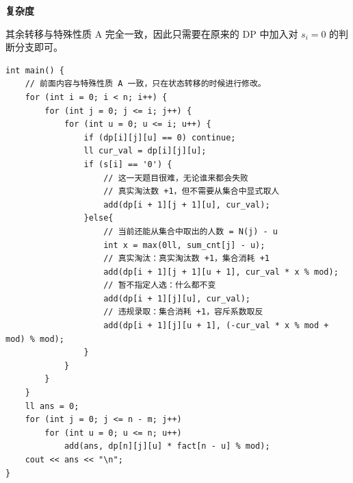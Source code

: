 \documentclass{book}
\begin{document}
\par\medskip
\noindent\textbf{复杂度}
\par\medskip
其余转移与特殊性质 A 完全一致，因此只需要在原来的 DP 中加入对 $s_i = 0$ 的判断分支即可。

\begin{lstlisting}[style = code]
int main() {
    // 前面内容与特殊性质 A 一致，只在状态转移的时候进行修改。
    for (int i = 0; i < n; i++) {
        for (int j = 0; j <= i; j++) {
            for (int u = 0; u <= i; u++) {
                if (dp[i][j][u] == 0) continue;
                ll cur_val = dp[i][j][u];
                if (s[i] == '0') {
                    // 这一天题目很难，无论谁来都会失败
                    // 真实淘汰数 +1，但不需要从集合中显式取人
                    add(dp[i + 1][j + 1][u], cur_val);
                }else{
                    // 当前还能从集合中取出的人数 = N(j) - u
                    int x = max(0ll, sum_cnt[j] - u);
                    // 真实淘汰：真实淘汰数 +1，集合消耗 +1
                    add(dp[i + 1][j + 1][u + 1], cur_val * x % mod);
                    // 暂不指定人选：什么都不变
                    add(dp[i + 1][j][u], cur_val);
                    // 违规录取：集合消耗 +1，容斥系数取反
                    add(dp[i + 1][j][u + 1], (-cur_val * x % mod + mod) % mod);
                }
            }
        }
    }
    ll ans = 0;
    for (int j = 0; j <= n - m; j++)
        for (int u = 0; u <= n; u++)
            add(ans, dp[n][j][u] * fact[n - u] % mod);
    cout << ans << "\n";
}
\end{lstlisting}
\end{document}
